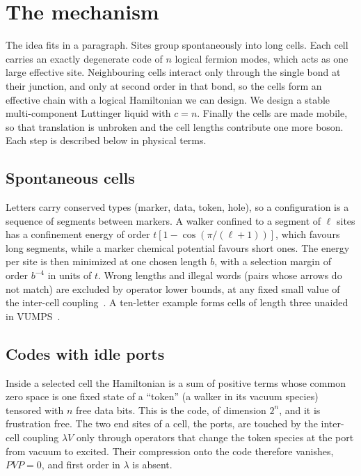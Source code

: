 \documentclass[11pt]{article}
\theoremstyle{definition}
\begin{document}
\section{The mechanism}
\label{sec:mech}

The idea fits in a paragraph. Sites group spontaneously into long cells. Each cell carries an exactly degenerate code of $n$ logical fermion modes, which acts as one large effective site. Neighbouring cells interact only through the single bond at their junction, and only at second order in that bond, so the cells form an effective chain with a logical Hamiltonian we can design. We design a stable multi-component Luttinger liquid with $c=n$. Finally the cells are made mobile, so that translation is unbroken and the cell lengths contribute one more boson. Each step is described below in physical terms.

\subsection{Spontaneous cells}

Letters carry conserved types (marker, data, token, hole), so a configuration is a sequence of segments between markers. A walker confined to a segment of $\ell$ sites has a confinement energy of order $t[1-\cos(\pi/(\ell+1))]$, which favours long segments, while a marker chemical potential favours short ones. The energy per site is then minimized at one chosen length $b$, with a selection margin of order $b^{-4}$ in units of $t$. Wrong lengths and illegal words (pairs whose arrows do not match) are excluded by operator lower bounds, at any fixed small value of the inter-cell coupling~\cite{campaign,C44}. A ten-letter example forms cells of length three unaided in VUMPS~\cite{demo}.

\subsection{Codes with idle ports}

Inside a selected cell the Hamiltonian is a sum of positive terms whose common zero space is one fixed state of a ``token'' (a walker in its vacuum species) tensored with $n$ free data bits. This is the code, of dimension $2^n$, and it is frustration free. The two end sites of a cell, the ports, are touched by the inter-cell coupling $\lambda V$ only through operators that change the token species at the port from vacuum to excited. Their compression onto the code therefore vanishes, $PVP=0$, and first order in $\lambda$ is absent.
\end{document}
